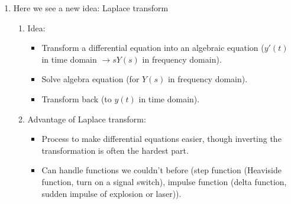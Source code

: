 \documentclass{article}
\begin{document}
\begin{enumerate}


\item Here we see a new idea: Laplace transform
\begin{enumerate}
\item Idea: 
\begin{itemize}
\item Transform a differential equation into an algebraic equation ($y'(t)$ in time domain $ \rightarrow sY(s)$ in frequency domain).
\item Solve algebra equation (for $Y(s)$ in frequency domain).
\item Transform back (to $y(t)$ in time domain). 
\end{itemize}
\item Advantage of Laplace transform:
\begin{itemize}
\item Process to make differential equations easier, though inverting the transformation is often the hardest part.
\item Can handle functions we couldn't before (step function (Heaviside function, turn on a signal switch), impulse function (delta function, sudden impulse of explosion or laser)).
\end{itemize}
\end{enumerate}


\end{enumerate}
\end{document}
